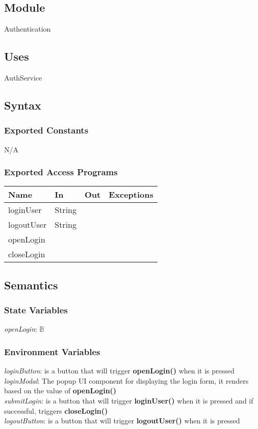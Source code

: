 \documentclass[12pt, titlepage]{article}
\begin{document}
	\subsection{Module}
	Authentication
	
	\subsection{Uses}
	AuthService
	
	\subsection{Syntax}
	
	\subsubsection{Exported Constants}
	N/A
	
	\subsubsection{Exported Access Programs}
	
	\begin{center}
		\begin{tabular}{l  l  l  l}
			\hline
			\textbf{Name} & \textbf{In} & \textbf{Out} & \textbf{Exceptions} \\
			\hline
			loginUser & String & ~ & ~ \\
			\hline
			logoutUser & String & ~ & ~ \\
			\hline
			openLogin & ~ & ~ & ~ \\
			\hline
			closeLogin & ~ & ~ & ~ \\
			\hline
		\end{tabular}
	\end{center}
	
	\subsection{Semantics}
	
	\subsubsection{State Variables}
	\textit{openLogin}: $\mathbb{B}$ \\
	
	\subsubsection{Environment Variables}
	\textit{loginButton}: is a button that will trigger \textbf{openLogin()} when it is pressed \\
	\textit{loginModal}: The popup UI component for displaying the login form, it renders based on the value of \textbf{openLogin()} \\
	\textit{submitLogin}: is a button that will trigger \textbf{loginUser()} when it is pressed and if successful, triggers \textbf{closeLogin()} \\
	\textit{logoutButton}: is a button that will trigger \textbf{logoutUser()} when it is pressed \\
	
\end{document}
